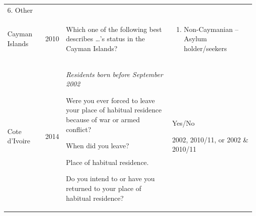 \documentclass[
]{article}
\providecommand{\tightlist}{%
  \setlength{\itemsep}{0pt}\setlength{\parskip}{0pt}}
\begin{document}
\begin{longtable}[]{@{}llll@{}}
\begin{minipage}[t]{0.22\columnwidth}
6. Other\strut
\end{minipage}\tabularnewline
\begin{minipage}[t]{0.22\columnwidth}\raggedright
Cayman Islands\strut
\end{minipage} & \begin{minipage}[t]{0.22\columnwidth}\raggedright
2010\strut
\end{minipage} & \begin{minipage}[t]{0.22\columnwidth}\raggedright
Which one of
the following
best describes
\ldots's status in
the Cayman
Islands?\strut
\end{minipage} & \begin{minipage}[t]{0.22\columnwidth}\raggedright
\begin{enumerate}
\def\labelenumi{\arabic{enumi}.}
\setcounter{enumi}{7}
\tightlist
\item
  Non-Caymanian
  -- Asylum
  holder/seekers
\end{enumerate}\strut
\end{minipage}\tabularnewline
\begin{minipage}[t]{0.22\columnwidth}\raggedright
Cote d'Ivoire\strut
\end{minipage} & \begin{minipage}[t]{0.22\columnwidth}\raggedright
2014\strut
\end{minipage} & \begin{minipage}[t]{0.22\columnwidth}\raggedright
\emph{Residents born
before
September 2002}

Were you ever
forced to leave
your place of
habitual
residence
because of war
or armed
conflict?

When did you
leave?

Place of
habitual
residence.

Do you intend
to or have you
returned to
your place of
habitual
residence?\strut
\end{minipage} & \begin{minipage}[t]{0.22\columnwidth}\raggedright
Yes/No

2002, 2010/11,
or 2002 \&
2010/11


\end{minipage}
\end{longtable}
\end{document}
